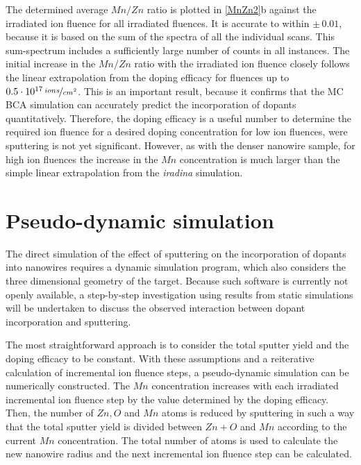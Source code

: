 The determined average $Mn/Zn$ ratio is plotted in \ref{MnZn2}b against the irradiated ion fluence for all irradiated fluences. It is accurate to within $\pm\,0.01$, because it is based on the sum of the spectra of all the individual scans. This sum-spectrum includes a sufficiently large number of counts in all instances. The initial increase in the $Mn/Zn$ ratio with the irradiated ion fluence closely follows the linear extrapolation from the doping efficacy for fluences up to $0.5\cdot 10^{17}\,\nicefrac{ions}{cm^2}$. This is an important result, because it confirms that the MC BCA simulation can accurately predict the incorporation of dopants quantitatively. Therefore, the doping efficacy is a useful number to determine the required ion fluence for a desired doping concentration for low ion fluences, were sputtering is not yet significant. However, as with the denser nanowire sample, for high ion fluences the increase in the $Mn$ concentration is much larger than the simple linear extrapolation from the \emph{iradina} simulation. 


\section{Pseudo-dynamic simulation}

The direct simulation of the effect of sputtering on the incorporation of dopants into nanowires requires a dynamic simulation program, which also considers the three dimensional geometry of the target. Because such software is currently not openly available, a step-by-step investigation using results from static simulations will be undertaken to discuss the observed interaction between dopant incorporation and sputtering.



The most straightforward approach is to consider the total sputter yield and the doping efficacy to be constant. With these assumptions and a reiterative calculation of incremental ion fluence steps, a pseudo-dynamic simulation can be numerically constructed. The $Mn$ concentration increases with each irradiated incremental ion fluence step by the value determined by the doping efficacy. Then, the number of $Zn, O$ and $Mn$ atoms is reduced by sputtering in such a way that the total sputter yield is divided between $Zn+O$ and $Mn$ according to the current $Mn$ concentration. The total number of atoms is used to calculate the new nanowire radius and the next incremental ion fluence step can be calculated.



